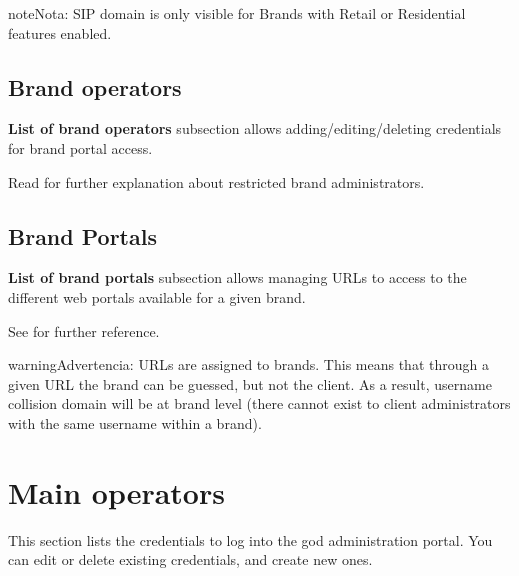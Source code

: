\documentclass[letterpaper,10pt,spanish]{sphinxmanual}
\begin{document}
\begin{notice}{note}{Nota:}
SIP domain is only visible for Brands with Retail or Residential features
enabled.
\end{notice}


\subsection{Brand operators}
\label{administration_portal/platform/brands:brand-operators}
\textbf{List of brand operators} subsection allows adding/editing/deleting credentials for brand portal access.

Read {\hyperref[api_rest/acls:acls]{}} for further explanation about restricted brand administrators.


\subsection{Brand Portals}
\label{administration_portal/platform/brands:brand-portals}
\textbf{List of brand portals} subsection allows managing URLs to access to the different web portals available for a given brand.

See {\hyperref[administration_portal/brand/settings/client_portals:client\string-portals]{}} for further reference.

\begin{notice}{warning}{Advertencia:}
URLs are assigned to brands. This means that through a given URL the brand can be guessed, but not the client.
As a result, username collision domain will be at brand level (there cannot exist to client administrators
with the same username within a brand).
\end{notice}


\section{Main operators}
\label{administration_portal/platform/main_operators::doc}\label{administration_portal/platform/main_operators:main-operators}
This section lists the credentials to log into the god administration portal. You can edit or delete existing credentials,
and create new ones.
\end{document}
